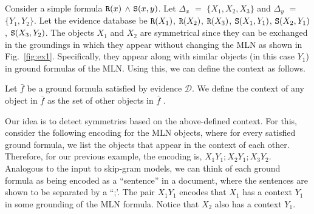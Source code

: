  
Consider a simple formula ${\tt R}(x)$ $\wedge$ ${\tt S}(x,y)$. Let $\Delta_x$ $=$ $\{X_1,X_2,X_3\}$ and $\Delta_y$ $=$ $\{Y_1,Y_2\}$. Let the evidence database be ${\tt R}(X_1)$, ${\tt R}(X_2)$, ${\tt R}(X_3)$, ${\tt S}(X_1,Y_1)$, ${\tt S}(X_2,Y_1)$, ${\tt S}(X_3,Y_2)$. The objects $X_1$ and $X_2$ are symmetrical since they can be exchanged in the groundings in which they appear without changing the MLN as shown in Fig.~\ref{fig:ex1}. Specifically, they appear  along with similar objects (in this case $Y_1$) in ground formulas of the MLN. Using this, we can define the context as follows.

 \begin{definition}
 Let $\bar{f}$ be a ground formula satisfied by evidence $\mathcal{D}$. We define the context of any object in $\bar{f}$  as the set of other objects in $\bar{f}$ .
 \end{definition}

Our idea is to detect symmetries based on the above-defined context. For this, consider the following encoding for the MLN objects, where for every satisfied ground formula, we list the objects that appear in the context of each other. Therefore, for our previous example, the encoding is, $X_1Y_1;X_2Y_1;X_3Y_2$. Analogous to the input to skip-gram models, we can think of each ground formula as being encoded as a ``sentence'' in a document, where the sentences are shown to be separated by a ``;'. The pair $X_1Y_1$ encodes that $X_1$ has a context $Y_1$ in some grounding of the MLN formula. Notice that $X_2$ also has a context $Y_1$.







